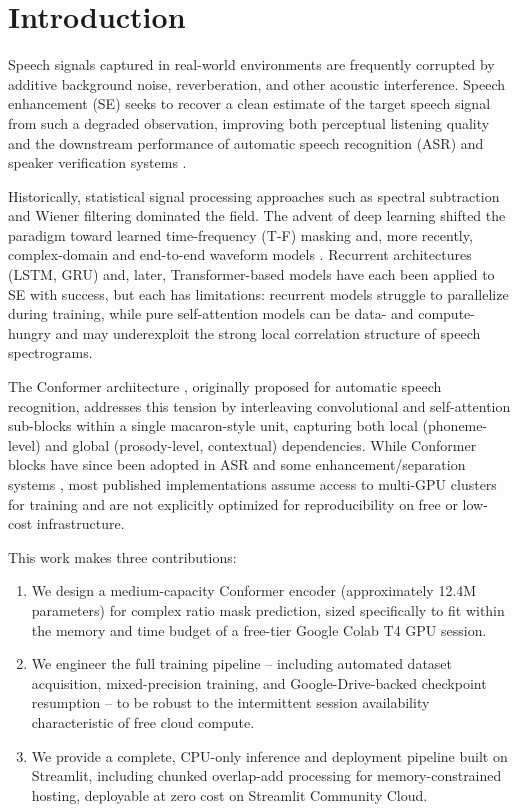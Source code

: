 \documentclass[conference]{IEEEtran}
\begin{document}
\section{Introduction}

Speech signals captured in real-world environments are frequently corrupted by additive
background noise, reverberation, and other acoustic interference. Speech enhancement (SE)
seeks to recover a clean estimate of the target speech signal from such a degraded
observation, improving both perceptual listening quality and the downstream performance of
automatic speech recognition (ASR) and speaker verification systems \cite{loizou2013speech}.

Historically, statistical signal processing approaches such as spectral subtraction
\cite{boll1979suppression} and Wiener filtering dominated the field. The advent of deep
learning shifted the paradigm toward learned time-frequency (T-F) masking and, more
recently, complex-domain and end-to-end waveform models
\cite{wang2018supervised,pandey2019new}. Recurrent architectures (LSTM, GRU) and, later,
Transformer-based models \cite{vaswani2017attention} have each been applied to SE with
success, but each has limitations: recurrent models struggle to parallelize during training,
while pure self-attention models can be data- and compute-hungry and may underexploit the
strong local correlation structure of speech spectrograms.

The Conformer architecture \cite{gulati2020conformer}, originally proposed for automatic
speech recognition, addresses this tension by interleaving convolutional and self-attention
sub-blocks within a single macaron-style unit, capturing both local (phoneme-level) and
global (prosody-level, contextual) dependencies. While Conformer blocks have since been
adopted in ASR and some enhancement/separation systems \cite{koizumi2021df}, most published
implementations assume access to multi-GPU clusters for training and are not explicitly
optimized for reproducibility on free or low-cost infrastructure.

This work makes three contributions:

\begin{enumerate}
\item We design a medium-capacity Conformer encoder (approximately 12.4M parameters) for
complex ratio mask prediction, sized specifically to fit within the memory and time budget
of a free-tier Google Colab T4 GPU session.
\item We engineer the full training pipeline -- including automated dataset acquisition,
mixed-precision training, and Google-Drive-backed checkpoint resumption -- to be robust to
the intermittent session availability characteristic of free cloud compute.
\item We provide a complete, CPU-only inference and deployment pipeline built on Streamlit,
including chunked overlap-add processing for memory-constrained hosting, deployable at zero
cost on Streamlit Community Cloud.
\end{enumerate}
\end{document}
